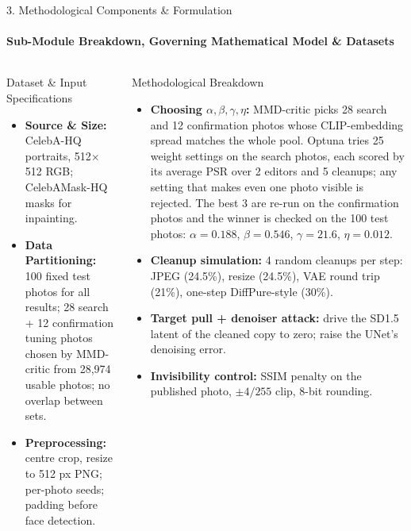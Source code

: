 \documentclass[aspectratio=169, 11pt]{beamer}
\begin{document}
\begin{frame}{3. Methodological Components \& Formulation}
    \framesubtitle{Sub-Module Breakdown, Governing Mathematical Model \& Datasets}
    \begin{columns}[T]
        \begin{block}{Dataset \& Input Specifications}
            \scriptsize
            \begin{itemize}
                \item \textbf{Source \& Size:} CelebA-HQ portraits, 512$\times$512 RGB; CelebAMask-HQ masks for inpainting.
                \item \textbf{Data Partitioning:} 100 fixed test photos for all results; 28 search + 12 confirmation tuning photos chosen by MMD-critic from 28,974 usable photos; no overlap between sets.
                \item \textbf{Preprocessing:} centre crop, resize to 512 px PNG; per-photo seeds; padding before face detection.
            \end{itemize}
        \end{block}

        \begin{block}{Methodological Breakdown}
            \scriptsize
            \begin{itemize}
                \item \textbf{Choosing $\alpha,\beta,\gamma,\eta$:} MMD-critic picks 28 search and 12 confirmation photos whose CLIP-embedding spread matches the whole pool. Optuna tries 25 weight settings on the search photos, each scored by its average PSR over 2 editors and 5 cleanups; any setting that makes even one photo visible is rejected. The best 3 are re-run on the confirmation photos and the winner is checked on the 100 test photos: $\alpha=0.188$, $\beta=0.546$, $\gamma=21.6$, $\eta=0.012$.
                \item \textbf{Cleanup simulation:} 4 random cleanups per step: JPEG (24.5\%), resize (24.5\%), VAE round trip (21\%), one-step DiffPure-style (30\%).
                \item \textbf{Target pull + denoiser attack:} drive the SD1.5 latent of the cleaned copy to zero; raise the UNet's denoising error.
                \item \textbf{Invisibility control:} SSIM penalty on the published photo, $\pm4/255$ clip, 8-bit rounding.
            \end{itemize}
        \end{block}
    \end{columns}
\end{frame}
\end{document}
